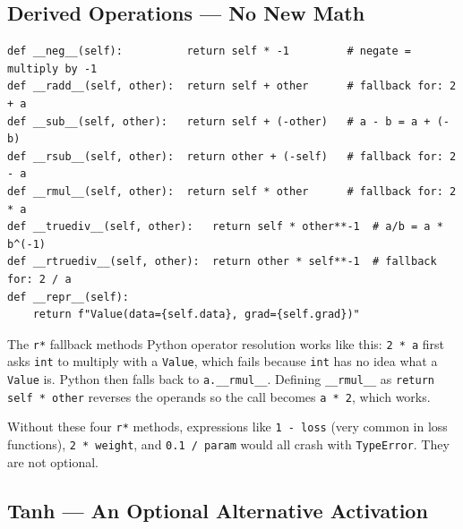 \documentclass[12pt,a4paper]{article}
\newcommand{\code}[1]{\texttt{\small\color{deepblue}#1}}
\begin{document}
\begin{center}
\end{center}

\subsection{Derived Operations — No New Math}

\begin{lstlisting}
def __neg__(self):          return self * -1         # negate = multiply by -1
def __radd__(self, other):  return self + other      # fallback for: 2 + a
def __sub__(self, other):   return self + (-other)   # a - b = a + (-b)
def __rsub__(self, other):  return other + (-self)   # fallback for: 2 - a
def __rmul__(self, other):  return self * other      # fallback for: 2 * a
def __truediv__(self, other):   return self * other**-1  # a/b = a * b^(-1)
def __rtruediv__(self, other):  return other * self**-1  # fallback for: 2 / a
def __repr__(self):
    return f"Value(data={self.data}, grad={self.grad})"
\end{lstlisting}

\begin{codeexplainbox}{The \texttt{r*} fallback methods}
Python operator resolution works like this: \code{2 * a} first asks \code{int} to multiply with a \code{Value}, which fails because \code{int} has no idea what a \code{Value} is. Python then falls back to \code{a.\_\_rmul\_\_}. Defining \code{\_\_rmul\_\_} as \code{return self * other} reverses the operands so the call becomes \code{a * 2}, which works.

Without these four \code{r*} methods, expressions like \code{1 - loss} (very common in loss functions), \code{2 * weight}, and \code{0.1 / param} would all crash with \code{TypeError}. They are not optional.
\end{codeexplainbox}

\subsection{Tanh — An Optional Alternative Activation}
\end{document}
